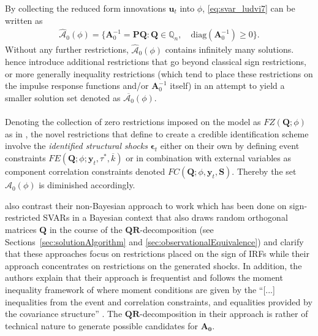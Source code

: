 \documentclass[a4paper,11pt,listof=nochaptergap,oneside,pointednumbers,bibtotoc,bigheadings,liststotoc,hidelinks]{scrbook}
\theoremstyle{mysatz}
\theoremstyle{mydefinition}
\theoremstyle{mytheorem}
\theoremstyle{mybemerkung}
\let\oldhat\hat
\newcommand{\vect}[1]{\boldsymbol{\mathbf{#1}}}
\newcommand{\hatt}[1]{\oldhat{\boldsymbol{\mathbf{#1}}}}
\begin{document}
By collecting the reduced form innovations $\vect{u}_t$ into $\phi$, \ref{eq:svar_ludvi7} can be written as 
\begin{equation} \label{eq:svar_ludvi8}
\begin{split}
 			\hatt{\mathcal{A}}_0(\phi) = \{\vect{A}_0^{-1} = \vect{P}\vect{Q}: \vect{Q} \in \mathbb{Q}_n, \quad \text{diag}(\vect{A}_0^{-1}) \geq 0\}.
\end{split}								
\end{equation}
Without any further restrictions, $\hatt{\mathcal{A}}_0(\phi)$ contains infinitely many solutions. \citet{ludvigsonetal:18,ludvigsonetal:19} hence introduce additional restrictions that go beyond classical sign restrictions, or more generally inequality restrictions (which tend to place these restrictions on the impulse response functions and/or $\vect{A}_0^{-1}$ itself) in an attempt to yield a smaller solution set denoted as $\overline{\mathcal{A}_0}(\phi)$.\\
\\
Denoting the collection of zero restrictions imposed on the model as $FZ(\vect{Q}; \phi)$ as in \citet{rubioetal:10}, the novel restrictions that \citet{ludvigsonetal:18,ludvigsonetal:19} define to create a credible identification scheme involve the \textit{identified structural shocks} $\vect{\epsilon}_t$ either on their own by defining event constraints $FE(\vect{Q}; \phi; \vect{y}_t, \tau^*, \overline{k})$ or in combination with external variables as component correlation constraints denoted $FC(\vect{Q}; \phi, \vect{y}_t, \vect{S})$. Thereby the set $\hatt{\mathcal{A}}_0(\phi)$ is diminished accordingly.

\citet{ludvigsonetal:18,ludvigsonetal:19} also contrast their non-Bayesian approach to work which has been done on sign-restricted SVARs in a Bayesian context that also draws random orthogonal matrices $\vect{Q}$ in the course of the $\vect{QR}$-decomposition (see Sections~\ref{sec:solutionAlgorithm} and \ref{sec:observationalEquivalence}) and clarify that these approaches focus on restrictions placed on the sign of IRFs while their approach concentrates on restrictions on the generated shocks. In addition, the authors explain that their approach is frequentist and follows the moment inequality framework of \citet{andrewsandsoares:10} where moment conditions are given by the ``[...] inequalities from the event and correlation constraints, and equalities provided by the covariance structure'' \citet[p. 14]{ludvigsonetal:19}. The $\vect{QR}$-decomposition in their approach is rather of technical nature to generate possible candidates for $\vect{A_0}$.
\end{document}

